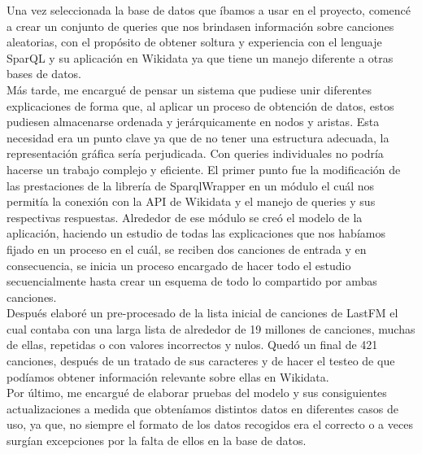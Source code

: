 Una vez seleccionada la base de datos que íbamos a usar en el proyecto, comencé a crear un conjunto de queries que nos brindasen información sobre canciones aleatorias, con el propósito de obtener soltura y experiencia con el lenguaje SparQL y su aplicación en Wikidata ya que tiene un manejo diferente a otras bases de datos.\\

Más tarde, me encargué de pensar un sistema que pudiese unir diferentes explicaciones de forma que, al aplicar un proceso de obtención de datos, estos pudiesen almacenarse ordenada y jerárquicamente en nodos y aristas. Esta necesidad era un punto clave ya que de no tener una estructura adecuada, la representación gráfica sería perjudicada. Con queries individuales no podría hacerse un trabajo complejo y eficiente. El primer punto fue la modificación de las prestaciones de la librería de SparqlWrapper en un módulo el cuál nos permitía la conexión con la API de Wikidata y el manejo de queries y sus respectivas respuestas. Alrededor de ese módulo se creó el modelo de la aplicación, haciendo un estudio de todas las explicaciones que nos habíamos fijado en un proceso en el cuál, se reciben dos canciones de entrada y en consecuencia, se inicia un proceso encargado de hacer todo el estudio secuencialmente hasta crear un esquema de todo lo compartido por ambas canciones.\\

Después elaboré un pre-procesado de la lista inicial de canciones de LastFM el cual contaba con una larga lista de alrededor de 19 millones de canciones, muchas de ellas, repetidas o con valores incorrectos y nulos. Quedó un final de 421 canciones, después de un tratado de sus caracteres y de hacer el testeo de que podíamos obtener información relevante sobre ellas en Wikidata.\\

Por último, me encargué de elaborar pruebas del modelo y sus consiguientes actualizaciones a medida que obteníamos distintos datos en diferentes casos de uso, ya que, no siempre el formato de los datos recogidos era el correcto o a veces surgían excepciones por la falta de ellos en la base de datos.\\
